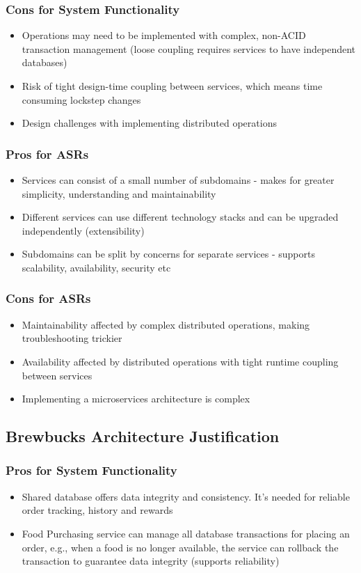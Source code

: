 \documentclass{article}
\begin{document}
\subsubsection*{Cons for System Functionality}
\begin{itemize}
    \item Operations may need to be implemented with complex, non-ACID transaction management (loose coupling requires services to have independent databases)
    \item Risk of tight design-time coupling between services, which means time consuming lockstep changes
    \item Design challenges with implementing distributed operations
\end{itemize}

\subsubsection*{Pros for ASRs}
\begin{itemize}
    \item Services can consist of a small number of subdomains - makes for greater simplicity, understanding and maintainability
    \item Different services can use different technology stacks and can be upgraded independently (extensibility)
    \item Subdomains can be split by concerns for separate services - supports scalability, availability, security etc
\end{itemize}
\subsubsection*{Cons for ASRs}
\begin{itemize}
    \item Maintainability affected by complex distributed operations, making troubleshooting trickier
    \item Availability affected by distributed operations with tight runtime coupling between services
    \item Implementing a microservices architecture is complex
\end{itemize}

\subsection{Brewbucks Architecture Justification}
\subsubsection*{Pros for System Functionality}
\begin{itemize}
    \item Shared database offers data integrity and consistency. It's needed for reliable order tracking, history and rewards
    \item Food Purchasing service can manage all database transactions for placing an order, e.g., when a food is no longer available, the service can rollback the transaction to guarantee data integrity (supports reliability)
\end{itemize}
\end{document}
